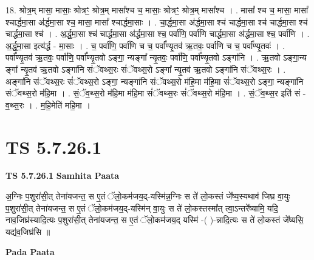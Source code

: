\documentclass[17pt]{extarticle}
\begin{document}
18. श्रोत्र॒म् मासा॒ मासाः॒ श्रोत्रꣳ॒॒ श्रोत्र॒म् मासा᳚श्च च॒ मासाः॒ श्रोत्रꣳ॒॒ श्रोत्र॒म् मासा᳚श्च । . मासा᳚ श्च च॒ मासा॒ मासा᳚ श्चार्द्धमा॒सा अ॑र्द्धमा॒सा श्च॒ मासा॒ मासा᳚ श्चार्द्धमा॒साः । . चा॒र्द्ध॒मा॒सा अ॑र्द्धमा॒सा श्च॑ चार्द्धमा॒सा श्च॑ चार्द्धमा॒सा श्च॑ चार्द्धमा॒सा श्च॑ । . अ॒र्द्ध॒मा॒सा श्च॑ चार्द्धमा॒सा अ॑र्द्धमा॒सा श्च॒ पर्वा॑णि॒ पर्वा॑णि चार्द्धमा॒सा अ॑र्द्धमा॒सा श्च॒ पर्वा॑णि । . अ॒र्द्ध॒मा॒सा इत्य॑र्द्ध - मा॒साः । . च॒ पर्वा॑णि॒ पर्वा॑णि च च॒ पर्वा᳚ण्यृ॒तव॑ ऋ॒तवः॒ पर्वा॑णि च च॒ पर्वा᳚ण्यृ॒तवः॑ । . पर्वा᳚ण्यृ॒तव॑ ऋ॒तवः॒ पर्वा॑णि॒ पर्वा᳚ण्यृ॒तवो ऽङ्गा॒ न्यङ्गा᳚ न्यृ॒तवः॒ पर्वा॑णि॒ पर्वा᳚ण्यृ॒तवो ऽङ्गा॑नि । . ऋ॒तवो ऽङ्गा॒न्य ङ्गा᳚ न्यृ॒तव॑ ऋ॒तवो ऽङ्गा॑नि संॅवथ्स॒रः सं॑ॅवथ्स॒रो ऽङ्गा᳚ न्यृ॒तव॑ ऋ॒तवो ऽङ्गा॑नि संॅवथ्स॒रः । . अङ्गा॑नि संॅवथ्स॒रः सं॑ॅवथ्स॒रो ऽङ्गा॒ न्यङ्गा॑नि संॅवथ्स॒रो म॑हि॒मा म॑हि॒मा सं॑ॅवथ्स॒रो ऽङ्गा॒ न्यङ्गा॑नि संॅवथ्स॒रो म॑हि॒मा । . सं॒ॅव॒थ्स॒रो म॑हि॒मा म॑हि॒मा सं॑ॅवथ्स॒रः सं॑ॅवथ्स॒रो म॑हि॒मा । . सं॒ॅव॒थ्स॒र इति॑ सं - व॒थ्स॒रः । . म॒हि॒मेति॑ महि॒मा । \newline
\pagebreak
{}

\section{ TS 5.7.26.1 }

\textbf{TS 5.7.26.1 } \newline
\textbf{Samhita Paata} \newline

अ॒ग्निः प॒शुरा॑सी॒त् तेना॑यजन्त॒ स ए॒तं ॅलो॒कम॑जय॒द्-यस्मि॑न्न॒ग्निः स ते॑ लो॒कस्तं जे᳚ष्य॒स्यथाव॑ जिघ्र वा॒युः प॒शुरा॑सी॒त् तेना॑यजन्त॒ स ए॒तं ॅलो॒कम॑जय॒द्-यस्मि॑न् वा॒युः स ते॑ लो॒कस्तस्मा᳚त् त्वा॒ऽन्तरे᳚ष्यामि॒ यदि॒ नाव॒जिघ्र॑स्यादि॒त्यः प॒शुरा॑सी॒त् तेना॑यजन्त॒ स ए॒तं ॅलो॒कम॑जय॒द् यस्मि॑ -( )-न्नादि॒त्यः स ते॑ लो॒कस्तं जे᳚ष्यसि॒ यद्य॑व॒जिघ्र॑सि ॥ \newline

\textbf{Pada Paata} \newline
\end{document}
